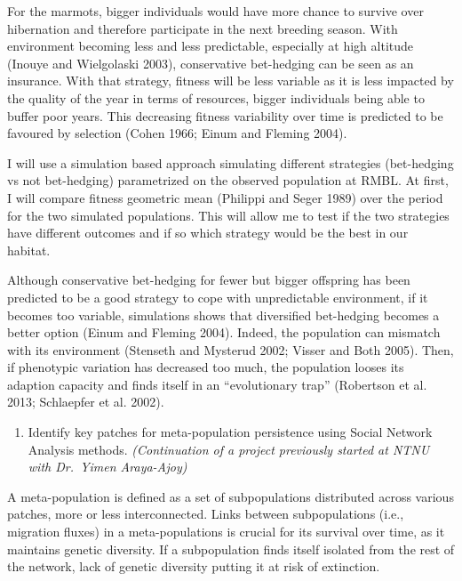 \documentclass[
  12pt,
  letterpaper,
]{scrartcl}
\providecommand{\tightlist}{%
  \setlength{\itemsep}{0pt}\setlength{\parskip}{0pt}}
\begin{document}
For the marmots, bigger individuals would have more chance to survive
over hibernation and therefore participate in the next breeding season.
With environment becoming less and less predictable, especially at high
altitude (Inouye and Wielgolaski 2003), conservative bet-hedging can be
seen as an insurance. With that strategy, fitness will be less variable
as it is less impacted by the quality of the year in terms of resources,
bigger individuals being able to buffer poor years. This decreasing
fitness variability over time is predicted to be favoured by selection
(Cohen 1966; Einum and Fleming 2004).

I will use a simulation based approach simulating different strategies
(bet-hedging vs not bet-hedging) parametrized on the observed population
at RMBL. At first, I will compare fitness geometric mean (Philippi and
Seger 1989) over the period for the two simulated populations. This will
allow me to test if the two strategies have different outcomes and if so
which strategy would be the best in our habitat.

Although conservative bet-hedging for fewer but bigger offspring has
been predicted to be a good strategy to cope with unpredictable
environment, if it becomes too variable, simulations shows that
diversified bet-hedging becomes a better option (Einum and Fleming
2004). Indeed, the population can mismatch with its environment
(Stenseth and Mysterud 2002; Visser and Both 2005). Then, if phenotypic
variation has decreased too much, the population looses its adaption
capacity and finds itself in an ``evolutionary trap'' (Robertson et al.
2013; Schlaepfer et al. 2002).

\begin{enumerate}
\def\labelenumi{\arabic{enumi}.}
\setcounter{enumi}{1}
\tightlist
\item
  Identify key patches for meta-population persistence using Social
  Network Analysis methods. \emph{(Continuation of a project previously
  started at NTNU with Dr.~Yimen Araya-Ajoy)}
\end{enumerate}

A meta-population is defined as a set of subpopulations distributed
across various patches, more or less interconnected. Links between
subpopulations (i.e., migration fluxes) in a meta-populations is crucial
for its survival over time, as it maintains genetic diversity. If a
subpopulation finds itself isolated from the rest of the network, lack
of genetic diversity putting it at risk of extinction.
\end{document}
